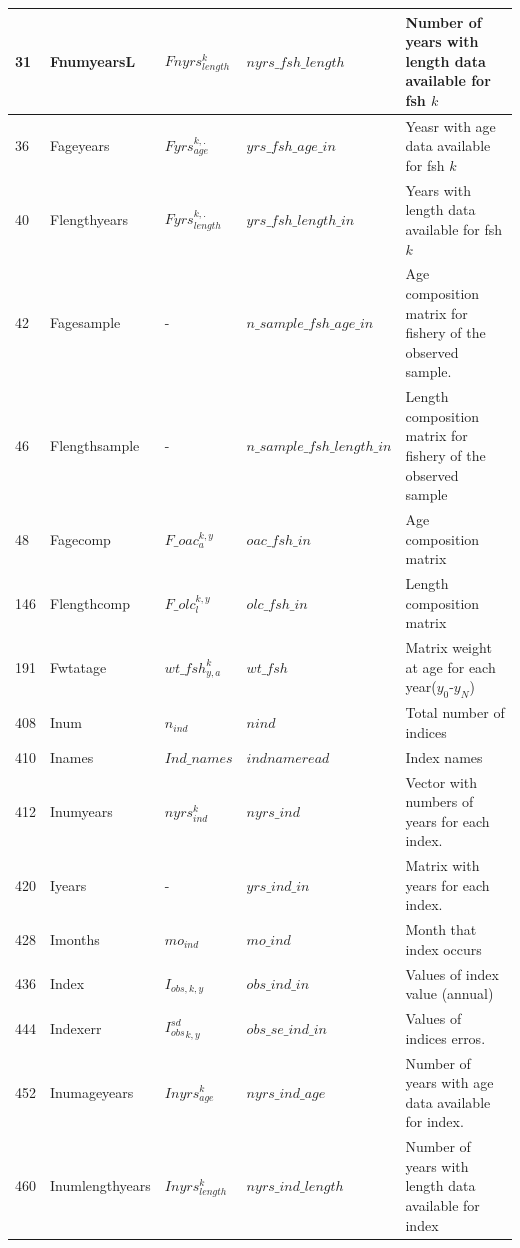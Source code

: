 \documentclass{article}
\begin{document}
\begin{table}[H]
\begin{tabular}{||  p{0.5cm} | p{1.9cm}  | p{1.9cm} | l | p{7cm} ||}
31 &   FnumyearsL  & $Fnyrs^k_{length}$ & $nyrs\_fsh\_length$ & Number of years with length data available for fsh $k$\\ \hline
36 &   Fageyears   & $Fyrs^{k,.}_{age}$ & $yrs\_fsh\_age\_in$ & 
Yeasr with age data available for fsh $k$\\ \hline
40 &   Flengthyears & $Fyrs^{k,.}_{length}$& $yrs\_fsh\_length\_in$ & Years with length data available for fsh $k$ \\ \hline
42 &   Fagesample   &  -                & $n\_sample\_fsh\_age\_in$ & Age composition matrix for fishery of the observed sample.\\ \hline
46 &   Flengthsample & -                & $n\_sample\_fsh\_length\_in$ & Length composition matrix for fishery of the observed sample\\ \hline
48 &   Fagecomp      & $F\_oac^{k,y}_a$                & $oac\_fsh\_in$ & Age composition matrix \\ \hline
146 &   Flengthcomp   & $F\_olc^{k,y}_l$                & $olc\_fsh\_in$ & Length composition matrix\\ \hline
191 &   Fwtatage      &  $wt\_fsh^{k}_{y,a}$ & $wt\_fsh$ & Matrix weight at age for each year($y_0$-$y_N$)\\ \hline
408 &  Inum         &  $n_{ind}$        & $nind$ & Total number of indices\\ \hline
410 &  Inames       & $Ind\_names$        & $indnameread$ & Index names\\ \hline
412 &  Inumyears    & $nyrs^k_{ind}$    & $nyrs\_ind$ & Vector with numbers of years for each index.\\ \hline
420 &  Iyears       &  -                & $yrs\_ind\_in$ & Matrix with years for each index.\\ \hline
428 &  Imonths      & $mo_{ind}$        & $mo\_ind$ & Month that index occurs \\ \hline
436 &  Index        &  $I_{obs,k,y}$                & $obs\_ind\_in$ & Values of index value (annual)\\ \hline
444 &  Indexerr     &  ${I_{obs}^{sd}}_{k,y}$                 & $obs\_se\_ind\_in$ & Values of indices erros.\\ \hline
452 &  Inumageyears &  $Inyrs^k_{age}$                & $nyrs\_ind\_age$ & Number of years with age data available for index.\\
\hline
460 &  Inumlengthyears &  $Inyrs^k_{length}$             & $nyrs\_ind\_length$ &  Number of years with length data available for index\\ \hline

\end{tabular}
\end{table}
\end{document}
